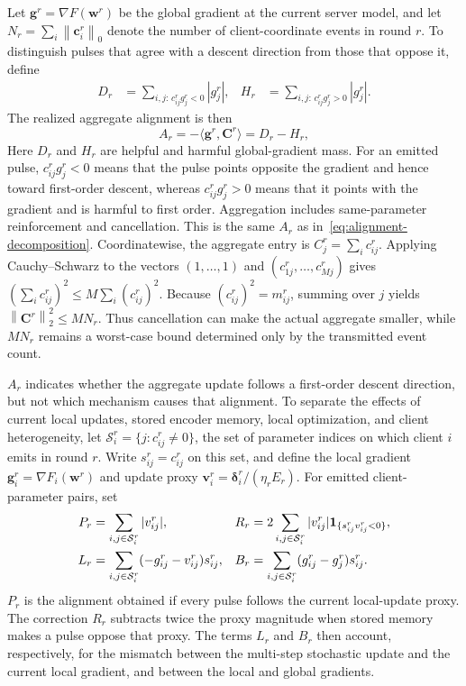 \documentclass[conference]{IEEEtran}
\newcommand{\norm}[1]{\left\lVert#1\right\rVert}
\newcommand{\ind}[1]{\mathbf{1}_{\{#1\}}}
\newcommand{\vect}[1]{\boldsymbol{#1}}
\newcommand{\rev}[1]{#1}
\newcommand{\newrev}[1]{#1}
\begin{document}
\rev{Let $\vect{g}^r=\nabla F(\vect{w}^r)$ be the global gradient at the current
server model,} and let
$N_r=\sum_i\norm{\vect{c}_i^r}_0$ denote the number of client-coordinate events in
round $r$. To distinguish pulses that agree with a descent direction from those
that oppose it, define
\begin{align}
 D_r&=\sum_{i,j:\,c_{ij}^rg_j^r<0}|g_j^r|,
 &H_r&=\sum_{i,j:\,c_{ij}^rg_j^r>0}|g_j^r| .
\end{align}
The realized aggregate alignment is then
\begin{equation}
 A_r=-\langle\vect{g}^r,\vect{C}^r\rangle=D_r-H_r,
 \label{eq:alignment}
\end{equation}
Here $D_r$ and $H_r$ are helpful and harmful global-gradient mass.
\rev{For an emitted pulse, $c_{ij}^rg_j^r<0$ means that the pulse points
opposite the gradient and hence toward first-order descent, whereas
$c_{ij}^rg_j^r>0$ means that it points with the gradient and is harmful to
first order.}
\rev{Aggregation includes same-\newrev{parameter} reinforcement and cancellation. This
is the same $A_r$ as in~\eqref{eq:alignment-decomposition}.} Coordinatewise,
\rev{the aggregate entry is $C_j^r=\sum_i c_{ij}^r$. Applying
Cauchy--Schwarz to the vectors $(1,\ldots,1)$ and
$(c_{1j}^r,\ldots,c_{Mj}^r)$ gives}
$(\sum_i c_{ij}^r)^2\leq M\sum_i(c_{ij}^r)^2$. Because
$(c_{ij}^r)^2=m_{ij}^r$, summing over $j$ yields
$\norm{\vect{C}^r}_2^2\leq MN_r$. \rev{Thus cancellation can make the actual
aggregate smaller, while $MN_r$ remains a worst-case bound determined only by
the transmitted event count.}

\newrev{$A_r$ indicates whether the aggregate update follows a first-order
descent direction, but not which mechanism causes that alignment.
To separate the effects of current local updates, \newrev{stored} encoder memory,
local optimization, and client heterogeneity, let}
$\mathcal S_i^r=\{j:c_{ij}^r\neq0\}$, \newrev{the set of parameter indices on
which client $i$ emits in round $r$}. Write $s_{ij}^r=c_{ij}^r$ on this set,
and define the local gradient
$\vect{g}_i^r=\nabla F_i(\vect{w}^r)$ and update proxy
$\vect{v}_i^r=\vect{\delta}_i^r/(\eta_rE_r)$. For emitted client-\newrev{parameter}
pairs, set
\begin{align}
 P_r&=\sum_{i,j\in\mathcal S_i^r}|v_{ij}^r|,
 &R_r&=2\sum_{i,j\in\mathcal S_i^r}|v_{ij}^r|
 \ind{s_{ij}^rv_{ij}^r<0}, \notag\\
 L_r&=\sum_{i,j\in\mathcal S_i^r}(-g_{ij}^r-v_{ij}^r)s_{ij}^r,
 &B_r&=\sum_{i,j\in\mathcal S_i^r}(g_{ij}^r-g_j^r)s_{ij}^r.
 \label{eq:alignment-components}
\end{align}
\rev{$P_r$ is the alignment obtained if every pulse follows the current
local-update proxy. The correction $R_r$ subtracts twice the proxy magnitude
when \newrev{stored} memory makes a pulse oppose that proxy. The terms $L_r$ and
$B_r$ then account, respectively, for the mismatch between the multi-step
stochastic update and the current local gradient, and between the local and
global gradients.}
\end{document}
